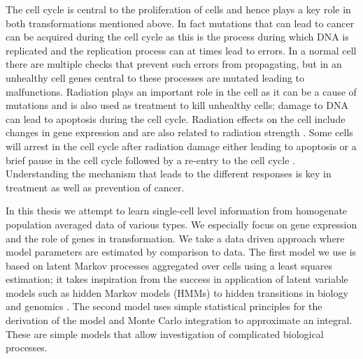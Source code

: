 The cell cycle is central to the proliferation of cells and hence plays a key role in both transformations mentioned above. In fact mutations that can lead to cancer can be acquired during the cell cycle as this is the process during which DNA is replicated and the replication process can at times lead to errors. In a normal cell there are multiple checks that prevent such errors from propagating, but in an unhealthy cell genes central to these processes are mutated leading to malfunctions. Radiation plays an important role in the cell as it can be a cause of mutations and is also used as treatment to kill unhealthy cells; damage to DNA can lead to apoptosis during the cell cycle. Radiation effects on the cell include changes in gene expression and are also related to radiation strength \citep{Gentile:2003in}. Some cells will arrest in the cell cycle after radiation damage either leading to apoptosis or a brief pause in the cell cycle followed by a re-entry to the cell cycle \citep{Pawlik2004928}. Understanding the mechanism that leads to the different responses is key in treatment as well as prevention of cancer.

In this thesis we attempt to learn single-cell level information from homogenate population averaged data of various types. We especially focus on gene expression and the role of genes in transformation. We take a data driven approach where model parameters are estimated by comparison to data. The first model we use is based on latent Markov processes aggregated over cells using a least squares estimation; it takes inspiration from the success in application of latent variable models such as hidden Markov models (HMMs) to hidden transitions in biology and genomics \citep{Yoon:2009dl,Ernst:2012iia}. The second model uses simple statistical principles for the derivation of the model and Monte Carlo integration to approximate an integral. These are simple models that allow investigation of complicated biological processes.


